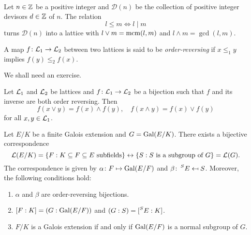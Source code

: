 \begin{example}
    Let $n \in \mathbb{Z}$ be a positive integer and $\mathcal{D}(n)$ be the collection of positive integer devisors $d \in \mathbb{Z}$ of $n$. The relation
    \[
    l \leq m \Longleftrightarrow l \mid m
    \]
    turns $\mathcal{D}(n)$ into a lattice with
    $l \vee m = \mathrm{mcm}(l,m)$ and $l \wedge m = \gcd(l,m)$.
\end{example}

A map $f\colon \mathcal{L}_1\to \mathcal{L}_2$ between two lattices is 
said to be \emph{order-reversing} if 
$x\leq_1 y$ implies $f(y)\leq_2 f(x)$. 

We shall need an exercise. 

\begin{exercise}
\label{xca:order_reversing}
    Let $\mathcal{L}_1$ and $\mathcal{L}_2$ be lattices and $f\colon \mathcal{L}_1\to \mathcal{L}_2$ be a bijection 
    such that $f$ and its inverse are both order reversing. Then 
    \[
    f(x\vee y)=f(x)\wedge f(y),\quad 
    f(x\wedge y)=f(x)\vee f(y)
    \]
    for all $x,y\in \mathcal{L}_1$. 
\end{exercise}



\begin{theorem}[Galois]
    Let $E/K$ be a finite Galois extension and $G=\operatorname{Gal}(E/K)$. 
    There exists a bijective correspondence
    \[
    \mathcal{L}(E/K)=\{F:K\subseteq F\subseteq E\text{ subfields}\}\leftrightarrow
    \{S:S\text{ is a subgroup of $G$}\}=\mathcal{L}(G). 
    \]
    The correspondence is given by $\alpha\colon F\mapsto \operatorname{Gal}(E/F)$ and 
    $\beta\colon \prescript{S}{}{E}\mapsfrom S$. Moreover, the following
    conditions hold:
    \begin{enumerate}
        \item $\alpha$ and $\beta$ are order-reversing bijections. 
        \item $[F:K]=(G:\operatorname{Gal}(E/F))$ and $(G:S)=[\prescript{S}{}{E}:K]$.
        \item $F/K$ is a Galois extension if and only if $\operatorname{Gal}(E/F)$ is a normal subgroup of $G$.        
    \end{enumerate}
\end{theorem}

